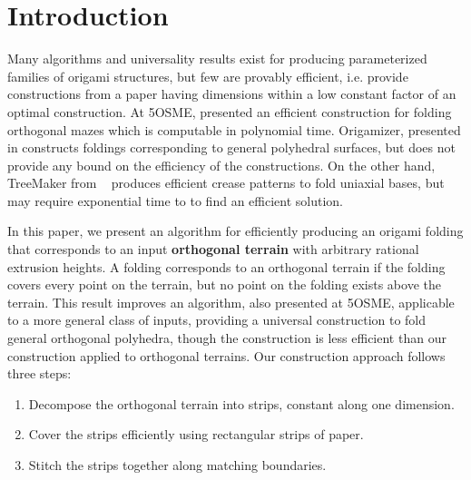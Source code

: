 \section{Introduction}
\label{sec:introduction}

Many algorithms and universality results exist for producing parameterized
families of origami structures, but few are provably efficient, i.e. provide
constructions from a paper having dimensions within a low constant factor of an
optimal construction. At 5OSME, \cite{MazeFolding_Origami5} presented an
efficient construction for folding orthogonal mazes which is computable in
polynomial time. Origamizer, presented in \cite{Origamizer_SoCG2017} constructs
foldings corresponding to general polyhedral surfaces, but does not provide any
bound on the efficiency of the constructions. On the other hand, TreeMaker from
~\cite{Lang} produces efficient crease patterns to fold uniaxial bases, but may
require exponential time to to find an efficient solution. 

In this paper, we present an algorithm for efficiently producing an origami
folding that corresponds to an input {\bf orthogonal terrain} with arbitrary
rational extrusion heights. A folding corresponds to an orthogonal terrain if
the folding covers every point on the terrain, but no point on the folding
exists above the terrain. This result improves an algorithm,
\cite{BoxPleating_Origami5} also presented at 5OSME, applicable to a more
general class of inputs, providing a universal construction to fold general
orthogonal polyhedra, though the construction is less efficient than our
construction applied to orthogonal terrains. Our construction approach follows
three steps: 

\vspace{-0.2pc} 
\begin{enumerate} 
\item Decompose the orthogonal terrain into strips, constant along one dimension.
\item Cover the strips efficiently using rectangular strips of paper.
\item Stitch the strips together along matching boundaries.
\end{enumerate}
\vspace{-0.2pc}

